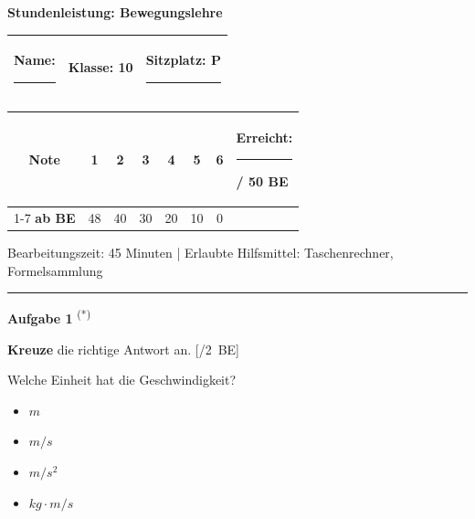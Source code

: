 \documentclass[11pt, a4paper]{article}
\newcommand{\fachfarbe}{physik}
\newcommand{\thema}{Bewegungslehre}
\newcommand{\klasse}{10}
\newcommand{\typ}{Stundenleistung}          %
\newcommand{\dauer}{45 Minuten}
\newcommand{\maxpunkte}{50}
\newcommand{\noteEins}{48}
\newcommand{\noteZwei}{40}
\newcommand{\noteDrei}{30}
\newcommand{\noteVier}{20}
\newcommand{\noteFuenf}{10}
\newcommand{\punkte}[1]{%
    \hfill\textcolor{grau}{[\hspace{0.5cm}/#1~BE]}%
}
\newcommand{\stern}[1]{%
    \textsuperscript{\textcolor{\fachfarbe}{(#1)}}%
}
\newenvironment{aufgabe}[2]{%
    \vspace{10pt}
    \noindent\textbf{\textcolor{\fachfarbe}{Aufgabe #1}} #2
    \vspace{5pt}
    \begin{list}{}{\leftmargin=0pt}
    \item[]
}{%
    \end{list}
}
\newcommand{\operator}[1]{\textbf{\textcolor{\fachfarbe}{#1}}}
\begin{document}

\begin{center}
    {\Large\bfseries \typ: \thema}
\end{center}

\vspace{5pt}

\noindent
\begin{tabularx}{\textwidth}{|X|X|X|}
\hline
\textbf{Name:} \rule{4cm}{0.4pt} & 
\textbf{Klasse:} \klasse & 
\textbf{Sitzplatz:} P\rule{1cm}{0.4pt} \\
\hline
\end{tabularx}

\vspace{10pt}

\noindent
\begin{tabularx}{\textwidth}{|c|c|c|c|c|c|c|X|}
\hline
\textbf{Note} & 1 & 2 & 3 & 4 & 5 & 6 & \multirow{2}{*}{\textbf{Erreicht:} \rule{1cm}{0.4pt} / \maxpunkte{} BE} \\
\cline{1-7}
\textbf{ab BE} & \noteEins & \noteZwei & \noteDrei & \noteVier & \noteFuenf & 0 & \\
\hline
\end{tabularx}

\vspace{5pt}

\noindent\textcolor{grau}{\small Bearbeitungszeit: \dauer{} | Erlaubte Hilfsmittel: Taschenrechner, Formelsammlung}

\vspace{10pt}
\hrule
\vspace{15pt}


\begin{aufgabe}{1}{\stern{*}}
\operator{Kreuze} die richtige Antwort an. \punkte{2}
\end{aufgabe}

\noindent Welche Einheit hat die Geschwindigkeit?

\begin{itemize}[label=$\square$, leftmargin=2em]
    \item $\si{m}$
    \item $\si{m/s}$
    \item $\si{m/s^2}$
    \item $\si{kg \cdot m/s}$
\end{itemize}
\end{document}
